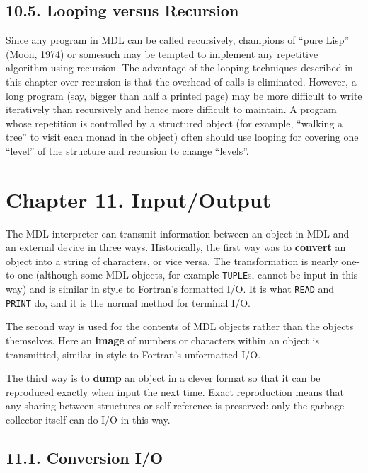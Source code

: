 \documentclass[a4paper,]{article}
\begin{document}
\subsection{10.5. Looping versus Recursion}\label{looping-versus-recursion}

Since any program in MDL can be called recursively, champions of ``pure Lisp'' (Moon, 1974) or somesuch may be tempted to
implement any repetitive algorithm using recursion. The advantage of the looping techniques described in this chapter over
recursion is that the overhead of calls is eliminated. However, a long program (say, bigger than half a printed page) may
be more difficult to write iteratively than recursively and hence more difficult to maintain. A program whose repetition is
controlled by a structured object (for example, ``walking a tree'' to visit each monad in the object) often should use
looping for covering one ``level'' of the structure and recursion to change ``levels''.

\section{Chapter 11. Input/Output}\label{chapter-11.-inputoutput}

The MDL interpreter can transmit information between an object in MDL and an external device in three ways. Historically,
the first way was to \textbf{convert} an object into a string of characters, or vice versa. The transformation is nearly
one-to-one (although some MDL objects, for example \texttt{TUPLE}s, cannot be input in this way) and is similar in style to
Fortran's formatted I/O. It is what \texttt{READ} and \texttt{PRINT} do, and it is the normal method for terminal I/O.

The second way is used for the contents of MDL objects rather than the objects themselves. Here an \textbf{image} of
numbers or characters within an object is transmitted, similar in style to Fortran's unformatted I/O.

The third way is to \textbf{dump} an object in a clever format so that it can be reproduced exactly when input the next
time. Exact reproduction means that any sharing between structures or self-reference is preserved: only the garbage
collector itself can do I/O in this way.

\subsection{11.1. Conversion I/O}\label{conversion-io}
\end{document}
